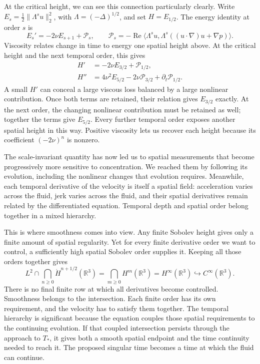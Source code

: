 At the critical height, we can see this connection particularly clearly.
Write \(E_s=\tfrac12\|\Lambda^su\|_2^2\), with
\(\Lambda=(-\Delta)^{1/2}\), and set \(H=E_{1/2}\). The energy identity
at order \(s\) is
\[
 E_s'=-2\nu E_{s+1}+\mathcal P_s,
 \qquad
 \mathcal P_s=-\operatorname{Re}\langle\Lambda^su,
 \Lambda^s((u\cdot\nabla)u+\nabla p)\rangle.
\]
Viscosity relates change in time to energy one spatial height above. At the
critical height and the next temporal order, this gives
\[
 \begin{aligned}
 H'&=-2\nu E_{3/2}+\mathcal P_{1/2},\\
 H''&=4\nu^2E_{5/2}-2\nu\mathcal P_{3/2}
       +\partial_t\mathcal P_{1/2}.
 \end{aligned}
\]
A small \(H'\) can conceal a large viscous loss balanced by a large
nonlinear contribution. Once both terms are retained, their relation gives
\(E_{3/2}\) exactly. At the next order, the changing nonlinear contribution
must be retained as well; together the terms give \(E_{5/2}\). Every further
temporal order exposes another spatial height in this way. Positive viscosity
lets us recover each height because its coefficient \((-2\nu)^n\) is
nonzero.

The scale-invariant quantity has now led us to spatial measurements that
become progressively more sensitive to concentration. We reached them by
following its evolution, including the nonlinear changes that evolution
requires. Meanwhile, each temporal derivative of the velocity is itself a
spatial field: acceleration varies across the fluid, jerk varies across the
fluid, and their spatial derivatives remain related by the differentiated
equation. Temporal depth and spatial order belong together in a mixed
hierarchy.

This is where smoothness comes into view. Any finite Sobolev height gives
only a finite amount of spatial regularity. Yet for every finite derivative
order we want to control, a sufficiently high spatial Sobolev order supplies
it. Keeping all those orders together gives
\[
 L^2\cap\bigcap_{n\ge0}\dot H^{n+1/2}(\mathbb R^3)
 =\bigcap_{m\ge0}H^m(\mathbb R^3)
 =H^\infty(\mathbb R^3)\hookrightarrow C^\infty(\mathbb R^3).
\]
There is no final finite row at which all derivatives become controlled.
Smoothness belongs to the intersection. Each finite order has its own
requirement, and the velocity has to satisfy them together. The temporal
hierarchy is significant because the equation couples those spatial
requirements to the continuing evolution. If that coupled intersection
persists through the approach to \(T_*\), it gives both a smooth spatial
endpoint and the time continuity needed to reach it. The proposed singular
time becomes a time at which the fluid can continue.

